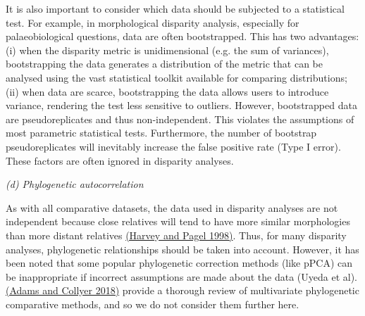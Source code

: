\documentclass[12pt,letterpaper]{article}
\renewcommand{\subsection}[1]{%
\bigskip
\begin{center}
\begin{large}
\normalfont\itshape #1
\end{large}
\end{center}}
\begin{document}
It is also important to consider which data should be subjected to a statistical test.
For example, in morphological disparity analysis, especially for palaeobiological questions, data are often bootstrapped.
This has two advantages: (i) when the disparity metric is unidimensional (e.g. the sum of variances), bootstrapping the data generates a distribution of the metric that can be analysed using the vast statistical toolkit available for comparing distributions; (ii) when data are scarce, bootstrapping the data allows users to introduce variance, rendering the test less sensitive to outliers.
However, bootstrapped data are pseudoreplicates and thus non-independent.
This violates the assumptions of most parametric statistical tests.
Furthermore, the number of bootstrap pseudoreplicates will inevitably increase the false positive rate (Type I error).
These factors are often ignored in disparity analyses.

\hypertarget{d-phylogenetic-autocorrelation}{%
\subsection{(d) Phylogenetic
autocorrelation}\label{d-phylogenetic-autocorrelation}}

As with all comparative datasets, the data used in disparity analyses are not independent because close relatives will tend to have more similar morphologies than more distant relatives \href{https://paperpile.com/c/sTGYvp/WXik}{(Harvey and Pagel 1998)}.
Thus, for many disparity analyses, phylogenetic relationships should be
taken into account.
However, it has been noted that some popular phylogenetic correction methods (like pPCA) can be inappropriate
if incorrect assumptions are made about the data (Uyeda et al). \href{https://paperpile.com/c/sTGYvp/ZnDd}{(Adams and Collyer 2018)}
provide a thorough review of multivariate phylogenetic comparative methods, and so we do not consider them further here.
\end{document}
